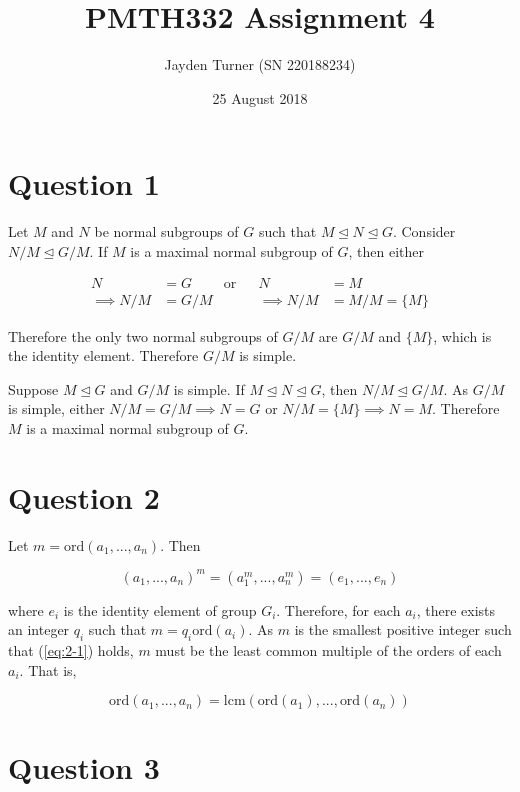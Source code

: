 \documentclass{article}
\title{PMTH332 Assignment 4}
\date{25 August 2018}
\author{Jayden Turner (SN 220188234)}
\begin{document}
\maketitle
{}

\section*{Question 1}

Let $M$ and $N$ be normal subgroups of $G$ such that
$M \trianglelefteq N \trianglelefteq G$. Consider $N/M \trianglelefteq G/M$. If $M$
is a maximal normal subgroup of $G$, then either

\begin{align*}
    N &= G & \text{or} && N &= M\\
    \implies N/M &= G/M & && \implies N/M &= M/M = \{M\}
\end{align*}

Therefore the only two normal subgroups of $G/M$ are $G/M$ and $\{M\}$, which is the
identity element. Therefore $G/M$ is simple.

\hfill \break
Suppose $M \trianglelefteq G$ and $G/M$ is simple. If
$M \trianglelefteq N \trianglelefteq G$, then $N/M \trianglelefteq G/M$. As $G/M$
is simple, either $N/M = G/M \implies N = G$ or $N/M = \{M\} \implies N = M$. Therefore
$M$ is a maximal normal subgroup of $G$.

\section*{Question 2}

Let $m = \text{ord}(a_1, ..., a_n)$. Then

\begin{equation} \label{eq:2-1}
    (a_1, ..., a_n)^m = (a_1^m, ..., a_n^m) = (e_1, ..., e_n)
\end{equation}

where $e_i$ is the identity element of group $G_i$. Therefore, for each $a_i$, there
exists an integer $q_i$ such that $m = q_i\text{ord}(a_i)$. As $m$ is the smallest
positive integer such that (\ref{eq:2-1}) holds, $m$ must be the least common
multiple of the orders of each $a_i$. That is,

\begin{equation*}
    \text{ord}(a_1, ..., a_n) = \text{lcm}(\text{ord}(a_1), ..., \text{ord}(a_n))
\end{equation*}

\section*{Question 3}
\end{document}
